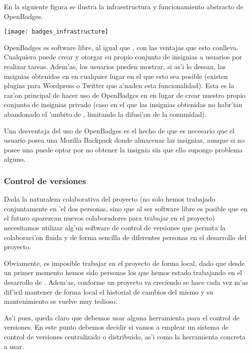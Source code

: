 En la siguiente figura se ilustra la infraestructura\cite{mozillawiki}  y funcionamiento abstracto de 
OpenBadges.

\begin{center}
\texttt{[image: badges\_infrastructure]}
\end{center}

OpenBadges es software libre, al igual que \Nipponline{}, con las ventajas que esto conlleva. Cualquiera puede crear y
otorgar su propio conjunto de insignias a usuarios por realizar tareas.
Adem'as, los usuarios pueden mostrar, si as'i lo desean, las insignias obtenidas en \Nipponline{} en cualquier lugar en
el que esto sea posible (existen plugins para Wordpress o Twitter que a'naden esta  funcionalidad). Esta es la raz'on
principal de hacer uso de OpenBadges en \Nipponline{} en lugar de crear nuestro propio conjunto de insignias privado
(caso en el que las insignias obtenidas no habr'ian abandonado el 'ambito de \Nipponline{}, limitando la difusi'on de la
comunidad).

Una desventaja del uso de OpenBadges es el hecho de que es necesario que el usuario posea una Mozilla Backpack donde
almacenar las insignias, aunque si no posee una puede optar por no obtener la insignia sin que ello supongo problema
alguno. 

\subsubsection{Control de versiones}
\label{sub:control_de_versiones}

Dada la naturaleza colaborativa del proyecto \Nipponline{} (no solo hemos trabajado conjuntamente en 'el dos personas, 
sino que al ser software libre es posible que en el futuro aparezcan nuevos colaboradores para trabajar en el 
proyecto) necesitamos utilizar alg'un software de control de versiones que permita la colaboraci'on fluida y de forma
sencilla de diferentes personas en el desarrollo del proyecto.

Obviamente, es imposible trabajar en el proyecto de forma local, dado que desde un primer momento hemos sido personas
los que hemos estado trabajando en el desarrollo de \Nipponline{}. Adem'as, conforme un proyecto va creciendo se hace
cada vez m'as dif'icil mantener de forma local el historial de cambios del mismo y su mantenimiento se vuelve muy
tedioso.

As'i pues, queda claro que debemos usar alguna herramienta para el control de versiones. En este punto debemos
decidir si vamos a emplear un sistema de control de versiones centralizado o distribuido, as'i como la herramienta
concreta a usar.

